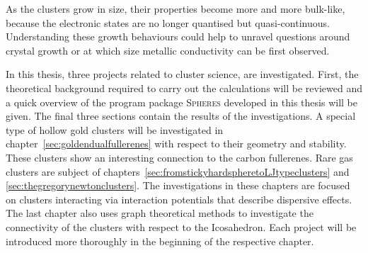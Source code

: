 As the clusters grow in size, their properties become more and more bulk-like,
because the electronic states are no longer quantised but quasi-continuous.
Understanding these growth behaviours could help to unravel questions around
crystal growth or at which size metallic conductivity can be first observed. 

In this thesis, three projects related to cluster science, are investigated.
First, the theoretical background required to carry out the calculations will be
reviewed and a quick overview of the program package \textsc{Spheres} developed
in this thesis will be given. The final three sections contain the results of
the investigations. A special type of hollow gold clusters will be investigated
in chapter~\ref{sec:goldendualfullerenes} with respect to their geometry and
stability. These clusters show an interesting connection to the carbon
fullerenes. Rare gas clusters are subject of
chapters~\ref{sec:fromstickyhardspheretoLJtypeclusters} and
\ref{sec:thegregorynewtonclusters}. The investigations in these chapters are
focused on clusters interacting via interaction potentials that describe
dispersive effects. The last chapter also uses graph theoretical methods to
investigate the connectivity of the clusters with respect to the Icosahedron.
Each project will be introduced more thoroughly in the beginning of the
respective chapter.

